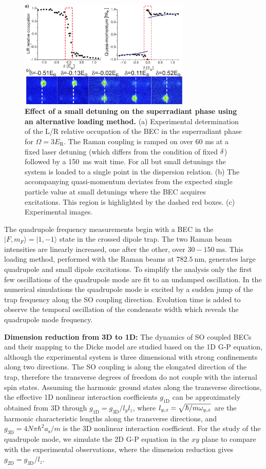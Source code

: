\documentclass[prl,aps,twocolumn,floatfix]{revtex4}
\begin{document}
\begin{figure}[tbp]
\centering
\includegraphics[width=3.2in]{SuppFigure-2Engels.eps}
\caption{ \textbf{Effect of a small detuning on the superradiant phase using an alternative loading method.} 
(a) Experimental determination of the L/R relative occupation of the BEC in
the superradiant phase for $\Omega =3E_{\text{R}}$. The Raman coupling is
ramped on over 60 ms at a fixed laser detuning (which differs from the
condition of fixed $\protect\delta $) followed by a 150~ms wait time. For
all but small detunings the system is loaded to a single point in the
dispersion relation. (b) The accompanying quasi-momentum deviates from the
expected single particle value at small detunings where the BEC acquires excitations. This region is highlighted by the dashed
red boxes. (c) Experimental images.}
\label{Fig2Supp}
\end{figure}

The quadrupole frequency measurements begin with a BEC in the $%
|F,m_{F}\rangle =|1,-1\rangle $ state in the crossed dipole trap. The two
Raman beam intensities are linearly increased, one after the other, over $%
30-150~\text{ms}$. This loading method, performed with the Raman beams at $%
782.5~\text{nm}$, generates large quadrupole and small dipole excitations.
To simplify the analysis only the first few oscillations of the quadrupole
mode are fit to an undamped oscillation. In the numerical simulations the
quadrupole mode is excited by a sudden jump of the trap frequency along the
SO coupling direction. Evolution time is added to observe the temporal
oscillation of the condensate width which reveals the quadrupole mode
frequency.

\textbf{Dimension reduction from 3D to 1D:} The dynamics of SO coupled BECs
and their mapping to the Dicke model are studied based on the 1D G-P
equation, although the experimental system is three dimensional with strong
confinements along two directions. The SO coupling is along the
elongated direction of the trap, therefore the transverse degrees of freedom
do not couple with the internal spin states. Assuming the harmonic ground
states along the transverse directions, the effective 1D nonlinear
interaction coefficients $g_{\text{1D}}$ can be approximately obtained from
3D through $g_{\text{1D}}=g_{\text{3D}}/l_{y}l_{z}$, where $l_{y,z}=\sqrt{%
\hbar/m\omega_{y,z}}$ are the harmonic characteristic lengths along the
transverse directions, and $g_{\text{3D}}=4N\pi\hbar^2a_\text{s}/m$ is the
3D nonlinear interaction coefficient. For the study of the quadrupole mode,
we simulate the 2D G-P equation in the $xy$ plane to compare with the
experimental observations, where the dimension reduction gives $g_{\text{2D}%
}=g_{\text{3D}}/l_{z}$.
\end{document}
